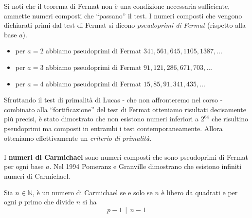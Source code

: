 \begin{osservazione}
	Si noti che il teorema di Fermat non è una condizione necessaria sufficiente, ammette numeri composti che \enquote{passano} il test. I numeri composti che vengono dichiarati primi dal test di Fermat si dicono \textit{pseudoprimi di Fermat} (rispetto alla base $a$).
	\begin{itemize}
		\item per $a=2$ abbiamo pseudoprimi di Fermat $341,561,645,1105,1387,\dots$
		\item per $a=3$ abbiamo pseudoprimi di Fermat $91,121,286,671,703,\dots$
		\item per $a=4$ abbiamo pseudoprimi di Fermat $15,85,91,341,435,\dots$
	\end{itemize}
Sfruttando il test di primalità di Lucas - che non affronteremo nel corso - combinato alla \enquote{fortificazione} del test di Fermat otteniamo risultati decisamente più precisi, è stato dimostrato che non esistono numeri inferiori a $2^{64}$ che risultino pseudoprimi ma composti in entrambi i test contemporaneamente. Allora otteniamo effettivamente un \textit{criterio di primalità}. \\ \\
I \textbf{numeri di Carmichael} sono numeri composti che sono pseudoprimi di Fermat per ogni base $a$. Nel 1994 Pomeranz e Granville dimostrano che esistono infiniti numeri di Carmichael.
\end{osservazione}
\begin{teorema}
	Sia $n\in \mathbb{N}$, è un numero di Carmichael se e solo se $n$ è libero da quadrati e per ogni $p$ primo che divide $n$ si ha
	\begin{equation*}
	p-1 \, \mid \, n-1
	\end{equation*}
\end{teorema}

